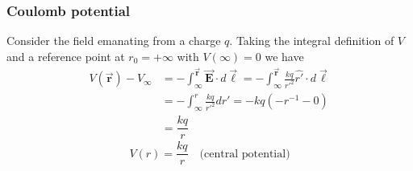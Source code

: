 \documentclass{beamer}
\newcommand{\vc}[1]{\vec{\boldsymbol{#1}}}
\begin{document}
\begin{frame}
\frametitle{Coulomb potential}
\small

Consider the field emanating from a charge $q$. Taking the integral definition of $V$ and a reference point at $r_{0}=+\infty$ with $V(\infty)=0$ we have
\begin{align}V(\vc{r})-V_{\infty }&=-\int_{\infty }^{\vc{r}} 
\vc{E} \cdot d \vc{\ell}=-\int_{\infty }^{\vc{r}}
\frac{k q}{r'^2} \hat{r'} \cdot d \vc{\ell}\\
&=-
\int_{\infty }^{r} \frac{k q}{r'^2} d r'= -kq\left(-r^{-1}-0\right)\\
&=\dfrac{kq}{r}
\end{align}
\pause
	\begin{equation}
		V(r) = \dfrac{kq}{r} \quad \text{(central potential)}
	\end{equation}
\end{frame}
\end{document}
